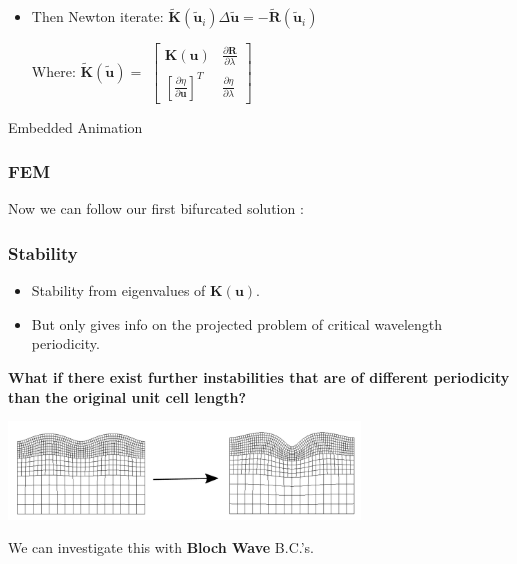\documentclass{beamer}
\begin{document}
\begin{frame}
\begin{itemize}
	\item Then Newton iterate: $\tilde{\mathbf{K}}(\tilde{\mathbf{u}}_i) \Delta \tilde{\mathbf{u}} = -\tilde{\mathbf{R}}(\tilde{\mathbf{u}}_i)$
	\vspace{0.05 in}
	
	Where: $\tilde{\mathbf{K}}(\tilde{\mathbf{u}}) = $
	$\begin{bmatrix}
	  \mathbf{K}(\mathbf{u}) & \frac{\partial\mathbf{R}}{\partial \lambda} \\ 
	  \left[ \frac{\partial \eta}{\partial \mathbf{u}} \right]^T & \frac{\partial{\eta}}{\partial \lambda}
	\end{bmatrix} $ 
\end{itemize}
\end{frame}

\begin{frame}{Embedded Animation}
	\frametitle{FEM}
	
	Now we can follow our first bifurcated solution :
	
        
\end{frame}

\begin{frame}
	\frametitle{Stability}

	\begin{itemize}
		\item Stability from eigenvalues of $\mathbf{K}(\mathbf{u})$.
		\item But only gives info on the projected problem of critical wavelength periodicity.

	\end{itemize}
	
	\begin{center}
	\textbf{What if there exist further instabilities that are of different periodicity than the original unit cell length?}
	\end{center}
	\begin{center}
		\includegraphics[width = 0.7\textwidth]{myFigures/periodic_change}
	\end{center}		
	
	\vspace{0.3 in}	
	We can investigate this with \color{blue}\textbf{Bloch Wave}  \color{black}B.C.'s.
	
	
\end{frame}
\end{document}
